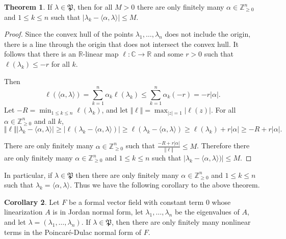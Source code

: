 \documentclass{article}
\theoremstyle{definition}
\newtheorem{theorem}{Theorem}
\newtheorem{corollary}[theorem]{Corollary}
\newcommand{\norm}[1]{\Vert #1 \Vert}
\begin{document}
\begin{theorem}
If $\lambda \in \mathfrak{P}$, then for all $M>0$ there are  only finitely many $\alpha \in \mathbb{Z}^n_{\geq 0}$
and $1 \leq k \leq n$ such that $|\lambda_k-\langle \alpha,\lambda \rangle| \leq M$.  
\end{theorem}
\begin{proof}
Since the convex hull of the points $\lambda_1,\ldots,\lambda_n$ does not include the origin,
there is a line through the origin that does not intersect the convex hull. It follows that there is
an $\mathbb{R}$-linear map $\ell:\mathbb{C} \to \mathbb{R}$ and some $r>0$ such that 
$\ell(\lambda_k) \leq -r$ for all $k$. 

Then
\[
\ell(\langle \alpha, \lambda \rangle)=\sum_{k=1}^n \alpha_k \ell(\lambda_k) \leq 
\sum_{k=1}^n \alpha_k (-r) = -r|\alpha|.
\]
Let $-R=\min_{1 \leq k \leq n} \ell(\lambda_k)$, and let
$\norm{\ell}=\max_{|z|=1} |\ell(z)|$. For all $\alpha \in \mathbb{Z}^n_{\geq 0}$ and all
$k$,
\[
\norm{\ell}|\lambda_k-\langle \alpha,\lambda \rangle| \geq |\ell(\lambda_k-\langle \alpha,\lambda \rangle)| \geq \ell(\lambda_k-\langle \alpha,\lambda \rangle) \geq \ell(\lambda_k)+r|\alpha| \geq -R+r|\alpha|.  
\]


There are only finitely many $\alpha \in \mathbb{Z}^n_{\geq 0}$ such that
$\frac{-R+r|\alpha|}{\norm{\ell}} \leq M$. Therefore there are only finitely many $\alpha \in \mathbb{Z}^n_{\geq 0}$
and $1 \leq k \leq n$ such that
$|\lambda_k-\langle \alpha,\lambda \rangle)| \leq M$.
\end{proof}

In particular, if $\lambda \in \mathfrak{P}$ then  there are only finitely many $\alpha \in \mathbb{Z}^n_{\geq 0}$
and $1 \leq k \leq n$
such that $\lambda_k=\langle \alpha,\lambda \rangle$. Thus we have the following
corollary to the above theorem.

\begin{corollary}
Let $F$ be a formal vector field with constant term $0$ whose linearization $A$ is in Jordan normal form, let $\lambda_1,\ldots,\lambda_n$ be the eigenvalues of $A$, and let $\lambda=(\lambda_1,\ldots,\lambda_n)$. If $\lambda \in \mathfrak{P}$, then there are only finitely many nonlinear terms in the Poincar\'e-Dulac normal form of $F$.
\end{corollary}
\end{document}
